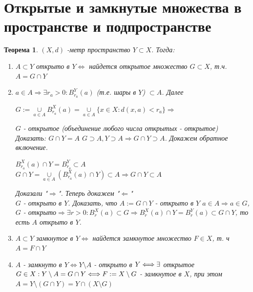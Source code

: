 \documentclass[12pt,letterpaper]{report}
\makeatletter
\newtheorem*{theorem-non}{Теорема}
\theoremstyle{definition}
\renewenvironment{proof}[1][\proofname]{%
   \par\pushQED{\qed}\normalfont%
   \topsep6\p@\@plus6\p@\relax
   \trivlist\item[\hskip\labelsep\bfseries#1\@addpunct{.}]%
   \ignorespaces
}{%
   \popQED\endtrivlist\@endpefalse
}
\makeatother
\begin{document}
\section{Открытые и замкнутые множества в пространстве и подпространстве}
    
    \begin{theorem-non}
        $(X, d)$ -метр пространство $Y \subset X$. Тогда:
        \begin{enumerate}
            \item $A \subset Y$ открыто в $Y \Longleftrightarrow$ найдется открытое множество $G \subset X$, т.ч. $A=G\cap Y$
            \begin{proof}
                $a \in A \Longrightarrow \exists r_a>0 : B_{r_a}^Y(a)$ (т.е. шары в $Y$) $\subset A$. Далее
                \begin{center}
                    $G:= \underset{a\in A}{\cup} B_{r_a}^X(a) = \underset{a\in A}{\cup} \{x \in X: d(x, a)<r_a\} \Longrightarrow$
                \end{center}
                $G$ - открытое (объединение любого числа открытых - открытое)
                Доказать: $G\cap Y = A$
                $G \supset A, Y \supset A \Longrightarrow G\cap Y \supset A$. Докажем обратное включение.
                \begin{center}
                    $B_{r_a}^X(a)\cap Y = B_{r_a}^Y \subset A$ \vspace*{0,2cm} \\
                    $G\cap Y = \underset{a\in A}{\cup}(B_{r_a}^X(a) \cap Y) \subset A \Longrightarrow G\cap Y \subset A$
                \end{center}
                Доказали "$\Longrightarrow$". Теперь докажем "$\Longleftarrow$"\\
                $G$ - открыто в $Y$. Доказать, что $A := G\cap Y$ - открыто в $Y$
                $a \in A \Longrightarrow a \in G$, $G$ - открыто$ \Longrightarrow \exists r>0 : B_r^X(a) \subset G \Longrightarrow B_r^X(a)\cap Y = B_r^Y(a) \subset G\cap Y$, то есть $A$ открыто в $Y$.
            \end{proof}
            \item $A \subset Y$ замкнутое в $Y \Longleftrightarrow$ найдется замкнутое множество $F \in X $, т. ч $A = F\cap Y$
            \begin{proof}
                $A$ - замкнуто в $Y \Longleftrightarrow Y\setminus A$ - открыто в $Y \Longleftrightarrow \\
                \exists$ открытое $G \in X : Y\setminus A = G\cap Y \Longleftrightarrow \\
                F := X\setminus G$ - замкнутое в $X$, при этом $A = Y\setminus (G\cap Y) = Y\cap (X\setminus G)$ \vspace*{0,2cm}\\
                 \par
            \end{proof}
        \end{enumerate}
    \end{theorem-non}
    
\end{document}
